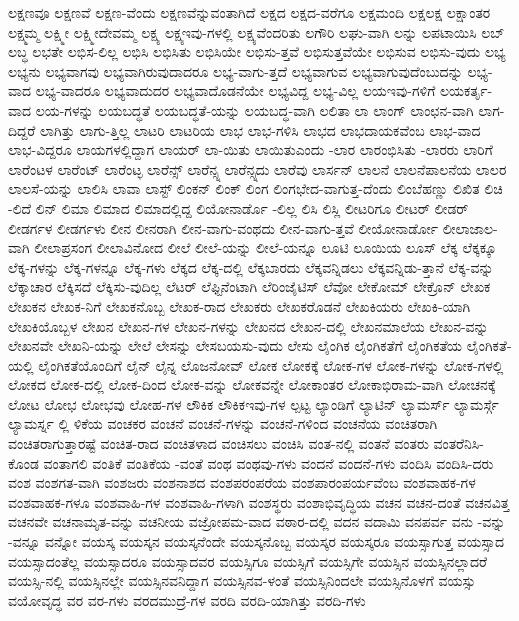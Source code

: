 {ಲಕ್ಷಣವೂ
ಲಕ್ಷಣವೆ
ಲಕ್ಷಣ-ವೆಂದು
ಲಕ್ಷಣವೆನ್ನುವಂತಾಗಿದೆ
ಲಕ್ಷದ
ಲಕ್ಷದ-ವರೆಗೂ
ಲಕ್ಷಮಂದಿ
ಲಕ್ಷಲಕ್ಷ
ಲಕ್ಷಾಂತರ
ಲಕ್ಷ್ಮಮ್ಮ
ಲಕ್ಷ್ಮೀ
ಲಕ್ಷ್ಮೀದೇವಮ್ಮ
ಲಕ್ಷ್ಯ
ಲಕ್ಷ್ಯಇವು-ಗಳಲ್ಲಿ
ಲಕ್ಷ್ಯವೆಂದರಿತು
ಲಗೌರಿ
ಲಘು-ವಾಗಿ
ಲನ್ನು
ಲಪಟಾಯಿಸಿ
ಲಬ್
ಲಬ್ಧ
ಲಭತೇ
ಲಭಿಸ-ಲಿಲ್ಲ
ಲಭಿಸಿ
ಲಭಿಸಿತು
ಲಭಿಸಿಯೇ
ಲಭಿಸು-ತ್ತವೆ
ಲಭಿಸುತ್ತವೆಯೇ
ಲಭಿಸುವ
ಲಭಿಸು-ವುದು
ಲಭ್ಯ
ಲಭ್ಯನು
ಲಭ್ಯವಾಗವು
ಲಭ್ಯವಾಗಿರುವುದಾದರೂ
ಲಭ್ಯ-ವಾಗು-ತ್ತದೆ
ಲಭ್ಯವಾಗುವ
ಲಭ್ಯವಾಗುವುದೆಂಬುದನ್ನು
ಲಭ್ಯ-ವಾದ
ಲಭ್ಯ-ವಾದರೂ
ಲಭ್ಯವಾದುದರ
ಲಭ್ಯವಾದೊಡನೆಯೇ
ಲಭ್ಯವಿದ್ದ
ಲಭ್ಯ-ವಿಲ್ಲ
ಲಯಇವು-ಗಳಿಗೆ
ಲಯಕರ್ತೃ-ವಾದ
ಲಯ-ಗಳನ್ನು
ಲಯಬದ್ಧತೆ
ಲಯಬದ್ಧತೆ-ಯನ್ನು
ಲಯಬದ್ಧ-ವಾಗಿ
ಲಲಿತಾ
ಲಾ
ಲಾಂಗ್
ಲಾಂಛನ-ವಾಗಿ
ಲಾಗ-ದಿದ್ದರೆ
ಲಾಗಿತ್ತು
ಲಾಗು-ತ್ತಿಲ್ಲ
ಲಾಟರಿ
ಲಾಟರಿಯ
ಲಾಭ
ಲಾಭ-ಗಳಿಸಿ
ಲಾಭದ
ಲಾಭದಾಯಕವೆಂಬ
ಲಾಭ-ವಾದ
ಲಾಭ-ವಿದ್ದರೂ
ಲಾಯಗಳಲ್ಲಿದ್ದಾಗ
ಲಾಯರ್
ಲಾ-ಯಿತು
ಲಾಯಿತುಎಂದು
-ಲಾರ
ಲಾರಂಭಿಸಿತು
-ಲಾರರು
ಲಾರಿಗೆ
ಲಾರೆಂಟಳ
ಲಾರೆಂಟ್
ಲಾರೆಂಟ್ಳ
ಲಾರೆನ್ಸ್
ಲಾರೆನ್ಸ್ನ
ಲಾರೆನ್ಸ್ನದು
ಲಾರೆವು
ಲಾರ್ಸನ್
ಲಾಲನೆ
ಲಾಲನೆಪಾಲನೆಯ
ಲಾಲರ
ಲಾಲಸೆ-ಯನ್ನು
ಲಾಲಿಸಿ
ಲಾವಾ
ಲಾಸ್ಟ್
ಲಿಂಕನ್
ಲಿಂಕ್
ಲಿಂಗ
ಲಿಂಗಭೇದ-ವಾಗುತ್ತ-ದೆಂದು
ಲಿಂಬೆಹಣ್ಣು
ಲಿಖಿತ
ಲಿಚಿ
-ಲಿದೆ
ಲಿನ್
ಲಿಮಾ
ಲಿಮಾದ
ಲಿಮಾದಲ್ಲಿದ್ದ
ಲಿಯೋನಾರ್ಡೊ
-ಲಿಲ್ಲ
ಲಿಸಿ
ಲಿಸ್ಲಿ
ಲೀಟರಿಗೂ
ಲೀಟರ್
ಲೀಡರ್
ಲೀಡರ್ಗಳ
ಲೀಡರ್ಗಳು
ಲೀನ
ಲೀನರಾಗಿ
ಲೀನ-ವಾಗು-ವಂಥದು
ಲೀನ-ವಾಗು-ತ್ತವೆ
ಲೀಯೋನಾರ್ಡೋ
ಲೀಲಾಜಾಲ-ವಾಗಿ
ಲೀಲಾಪ್ರಸಂಗ
ಲೀಲಾವಿನೋದ
ಲೀಲೆ
ಲೀಲೆ-ಯನ್ನು
ಲೀಲೆ-ಯನ್ನೂ
ಲೂಟಿ
ಲೂಯಿಯ
ಲೂಸ್
ಲೆಕ್ಕ
ಲೆಕ್ಕಕ್ಕೂ
ಲೆಕ್ಕ-ಗಳನ್ನು
ಲೆಕ್ಕ-ಗಳನ್ನೂ
ಲೆಕ್ಕ-ಗಳು
ಲೆಕ್ಕದ
ಲೆಕ್ಕ-ದಲ್ಲಿ
ಲೆಕ್ಕಬಾರದು
ಲೆಕ್ಕವನ್ನಿಡಲು
ಲೆಕ್ಕವನ್ನಿಡು-ತ್ತಾನೆ
ಲೆಕ್ಕ-ವನ್ನು
ಲೆಕ್ಕಾಚಾರ
ಲೆಕ್ಕಿಸದೆ
ಲೆಕ್ಕಿಸು-ವುದಿಲ್ಲ
ಲೆಟರ್
ಲೆಫ್ಟಿನೆಂಟಾಗಿ
ಲೆರಿಂಜೈಟಿಸ್
ಲೆವೋ
ಲೇಕೋಮ್
ಲೇಕ್ರೊನ್
ಲೇಖಕ
ಲೇಖಕನ
ಲೇಖಕ-ನಿಗೆ
ಲೇಖಕನೊಬ್ಬ
ಲೇಖಕ-ರಾದ
ಲೇಖಕರು
ಲೇಖಕರೊಡನೆ
ಲೇಖಕಿಯರು
ಲೇಖಕಿ-ಯಾಗಿ
ಲೇಖಕಿಯೊಬ್ಬಳ
ಲೇಖನ
ಲೇಖನ-ಗಳ
ಲೇಖನ-ಗಳನ್ನು
ಲೇಖನದ
ಲೇಖನ-ದಲ್ಲಿ
ಲೇಖನಮಾಲೆಯ
ಲೇಖನ-ವನ್ನು
ಲೇಖನವೇ
ಲೇಖನಿ-ಯನ್ನು
ಲೇಲೆ
ಲೇಸನ್ನು
ಲೇಸಬಯಸು-ವುದು
ಲೇಸು
ಲೈಂಗಿಕ
ಲೈಂಗಿಕತೆಗೆ
ಲೈಂಗಿಕತೆಯ
ಲೈಂಗಿಕತೆ-ಯಲ್ಲಿ
ಲೈಂಗಿಕತೆಯೊಂದಿಗೆ
ಲೈನ್
ಲೈನ್ನ
ಲೊಜನೋವ್
ಲೋಕ
ಲೋಕಕ್ಕೆ
ಲೋಕ-ಗಳ
ಲೋಕ-ಗಳನ್ನು
ಲೋಕ-ಗಳಲ್ಲಿ
ಲೋಕದ
ಲೋಕ-ದಲ್ಲಿ
ಲೋಕ-ದಿಂದ
ಲೋಕ-ವನ್ನು
ಲೋಕವನ್ನೇ
ಲೋಕಾಂತರ
ಲೋಕಾಭಿರಾಮ-ವಾಗಿ
ಲೋಚನಕ್ಕೆ
ಲೋಟ
ಲೋಭ
ಲೋಭವು
ಲೋಹ-ಗಳ
ಲೌಕಿಕ
ಲೌಕಿಕಇವು-ಗಳ
ಲ್ಪಟ್ಟ
ಲ್ಯಾಂಡಿಗೆ
ಲ್ಯಾಟಿನ್
ಲ್ಯಾಮರ್ಸ್
ಲ್ಯಾಮರ್ಸ್ಗೆ
ಲ್ಯಾಮರ್ಸ್ನ
ಲ್ಲಿ
ಳಿಕೆಯ
ವಂಚಕರ
ವಂಚನೆ
ವಂಚನೆ-ಗಳನ್ನು
ವಂಚನೆ-ಗಳಿಂದ
ವಂಚನೆಯ
ವಂಚಿತರಾಗಿ
ವಂಚಿತರಾಗುತ್ತಾರಷ್ಟೆ
ವಂಚಿತ-ರಾದ
ವಂಚಿತಳಾದ
ವಂಚಿಸಲು
ವಂಚಿಸಿ
ವಂತ-ನಲ್ಲಿ
ವಂತನೆ
ವಂತರು
ವಂತರೆನಿಸಿ-ಕೊಂಡ
ವಂತಾಗಲಿ
ವಂತಿಕೆ
ವಂತಿಕೆಯ
-ವಂತೆ
ವಂಥ
ವಂಥವು-ಗಳು
ವಂದನೆ
ವಂದನೆ-ಗಳು
ವಂದಿಸಿ
ವಂದಿಸಿ-ದರು
ವಂಶ
ವಂಶಗತ-ವಾಗಿ
ವಂಶಜರು
ವಂಶನಾಶದ
ವಂಶಪರಂಪರೆಯ
ವಂಶಪಾರಂಪರ್ಯವೆಂಬ
ವಂಶವಾಹಕ-ಗಳ
ವಂಶವಾಹಕ-ಗಳೂ
ವಂಶವಾಹಿ-ಗಳ
ವಂಶವಾಹಿ-ಗಳಾಗಿ
ವಂಶಸ್ಥರು
ವಂಶಾಭಿವೃದ್ಧಿಯ
ವಚನ
ವಚನ-ದಂತೆ
ವಚನವಿತ್ತ
ವಚನವೇ
ವಚನಾಮೃತ-ವನ್ನು
ವಚನೀಯ
ವಜ್ರೋಪಮ-ವಾದ
ವಠಾರ-ದಲ್ಲಿ
ವದನ
ವದಾಮಿ
ವನಪರ್ವ
ವನು
-ವನ್ನು
-ವನ್ನೂ
ವನ್ನೋ
ವಯಸ್ಕ
ವಯಸ್ಕನ
ವಯಸ್ಕನೆಂದೇ
ವಯಸ್ಕನೊಬ್ಬ
ವಯಸ್ಕರ
ವಯಸ್ಕರೂ
ವಯಸ್ಸಾಗುತ್ತ
ವಯಸ್ಸಾದ
ವಯಸ್ಸಾದಂತೆಲ್ಲ
ವಯಸ್ಸಾದರೂ
ವಯಸ್ಸಾದವರ
ವಯಸ್ಸಿಗೂ
ವಯಸ್ಸಿಗೆ
ವಯಸ್ಸಿಗೇ
ವಯಸ್ಸಿನ
ವಯಸ್ಸಿನಲ್ಲಾದರೆ
ವಯಸ್ಸಿ-ನಲ್ಲಿ
ವಯಸ್ಸಿನಲ್ಲೇ
ವಯಸ್ಸಿನವನಿದ್ದಾಗ
ವಯಸ್ಸಿನವ-ಳಂತೆ
ವಯಸ್ಸಿನಿಂದಲೇ
ವಯಸ್ಸಿನೊಳಗೆ
ವಯಸ್ಸು
ವಯೋವೃದ್ಧ
ವರ
ವರ-ಗಳು
ವರದಮುದ್ರೆ-ಗಳ
ವರದಿ
ವರದಿ-ಯಾಗಿತ್ತು
ವರದಿ-ಗಳು
}
